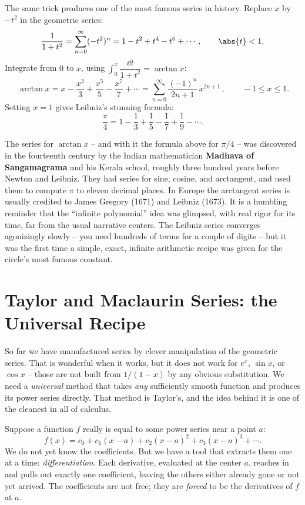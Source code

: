 \begin{example}
\label{ch30:ex-arctan}
The same trick produces one of the most famous series in history. Replace $x$ by $-t^2$ in the geometric series:
\[
  \frac{1}{1+t^2} = \sum_{n=0}^{\infty}(-t^2)^n = 1 - t^2 + t^4 - t^6 + \cdots, \qquad \abs{t}<1.
\]
Integrate from $0$ to $x$, using $\int_0^x \dfrac{\dd t}{1+t^2} = \arctan x$:
\[
  \boxed{\,\arctan x = x - \frac{x^3}{3} + \frac{x^5}{5} - \frac{x^7}{7} + \cdots
  = \sum_{n=0}^{\infty}\frac{(-1)^n}{2n+1}\,x^{2n+1}\,}, \qquad -1 \le x \le 1.
\]
Setting $x=1$ gives Leibniz's stunning formula:
\[
  \frac{\pi}{4} = 1 - \frac13 + \frac15 - \frac17 + \frac19 - \cdots.
\]
\end{example}

\begin{historybox}
The series for $\arctan x$ -- and with it the formula above for $\pi/4$ -- was discovered in the fourteenth century by the Indian mathematician \textbf{Madhava of Sangamagrama} and his Kerala school, roughly three hundred years before Newton and Leibniz. They had series for sine, cosine, and arctangent, and used them to compute $\pi$ to eleven decimal places. In Europe the arctangent series is usually credited to James Gregory (1671) and Leibniz (1673). It is a humbling reminder that the ``infinite polynomial'' idea was glimpsed, with real rigor for its time, far from the usual narrative centers. The Leibniz series converges agonizingly slowly -- you need hundreds of terms for a couple of digits -- but it was the first time a simple, exact, infinite arithmetic recipe was given for the circle's most famous constant.
\end{historybox}

\section{Taylor and Maclaurin Series: the Universal Recipe}
\label{ch30:sec-taylor}

So far we have manufactured series by clever manipulation of the geometric series. That is wonderful when it works, but it does not work for $e^x$, $\sin x$, or $\cos x$ -- those are not built from $1/(1-x)$ by any obvious substitution. We need a \emph{universal} method that takes \emph{any} sufficiently smooth function and produces its power series directly. That method is Taylor's, and the idea behind it is one of the cleanest in all of calculus.

\begin{intuitionbox}
Suppose a function $f$ really is equal to some power series near a point $a$:
\[
  f(x) = c_0 + c_1(x-a) + c_2(x-a)^2 + c_3(x-a)^3 + \cdots.
\]
We do not yet know the coefficients. But we have a tool that extracts them one at a time: \emph{differentiation}. Each derivative, evaluated at the center $a$, reaches in and pulls out exactly one coefficient, leaving the others either already gone or not yet arrived. The coefficients are not free; they are \emph{forced} to be the derivatives of $f$ at $a$.
\end{intuitionbox}

